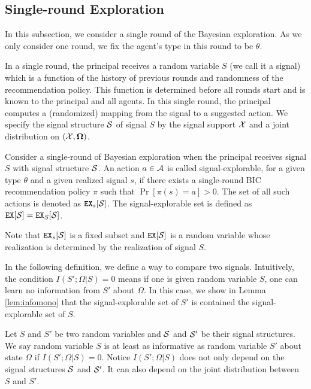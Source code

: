 \subsection{Single-round Exploration}
\label{sec:public_single}

In this subsection, we consider a single round of the Bayesian exploration. As we only consider one round, we fix the agent's type in this round to be $\theta$.

In a single round, the principal receives a random variable $S$ (we call it a signal) which is a function of the history of previous rounds and randomness of the recommendation policy. This function is determined before all rounds start and is known to the principal and all agents. In this single round, the principal computes a (randomized) mapping from the signal to a suggested action. We specify the signal structure $\S$ of signal $S$ by the signal support $\X$ and a joint distribution on $(\X, \varOmega)$.


\begin{definition}
Consider a single-round of Bayesian exploration when the principal receives signal $S$ with signal structure $\S$. An action $a \in \A$ is called signal-explorable, for a given type $\theta$ and a given realized signal $s$, if there exists a single-round BIC recommendation policy $\pi$ such that $\Pr[\pi(s) = a] > 0$. The set of all such actions is denoted as $\EX_s[\S]$. The signal-explorable set is defined as $\EX[\S] = \EX_S[\S]$.
\end{definition}

Note that $\EX_s[\S]$ is a fixed subset and $\EX[\S]$ is a random variable whose realization is determined by the realization of signal $S$.

In the following definition, we define a way to compare two signals. Intuitively, the condition $I(S';\Omega|S)= 0$  means if one is given random variable $S$, one can learn no information from $S'$ about $\Omega$. In this case, we show in Lemma \ref{lem:infomono} that the signal-explorable set of $S'$ is contained the signal-explorable set of $S$.
\begin{definition}
Let $S$ and $S'$ be two random variables and $\S$ and $\S'$ be their signal structures. We say random variable $S$ is at least as informative as random variable $S'$ about state $\Omega$ if $I(S' ; \Omega|S) = 0$. Notice $I(S';\Omega|S)$ does not only depend on the signal structures $\S$ and $\S'$. It can also depend on the joint distribution between $S$ and $S'$.
\end{definition}

